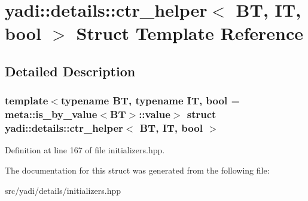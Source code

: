 \hypertarget{structyadi_1_1details_1_1ctr__helper}{}\section{yadi\+:\+:details\+:\+:ctr\+\_\+helper$<$ BT, IT, bool $>$ Struct Template Reference}
\label{structyadi_1_1details_1_1ctr__helper}


\subsection{Detailed Description}
\subsubsection*{template$<$typename BT, typename IT, bool = meta\+::is\+\_\+by\+\_\+value$<$\+B\+T$>$\+::value$>$\newline
struct yadi\+::details\+::ctr\+\_\+helper$<$ B\+T, I\+T, bool $>$}



Definition at line 167 of file initializers.\+hpp.



The documentation for this struct was generated from the following file\+:\begin{DoxyCompactItemize}
\item 
src/yadi/details/initializers.\+hpp\end{DoxyCompactItemize}
